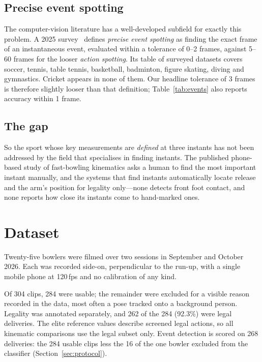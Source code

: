 \documentclass[11pt,a4paper]{article}
\begin{document}
\subsection{Precise event spotting}

The computer-vision literature has a well-developed subfield for
exactly this problem. A 2025 survey~\cite{pes2025} defines \emph{precise event
spotting} as finding the exact frame of an instantaneous event, evaluated
within a tolerance of 0--2 frames, against 5--60 frames for the looser
\emph{action spotting}. Its table of surveyed datasets covers soccer, tennis,
table tennis, basketball, badminton, figure skating, diving and gymnastics.
Cricket appears in none of them. Our headline tolerance of 3 frames is
therefore slightly looser than that definition; Table~\ref{tab:events} also
reports accuracy within 1 frame.

\subsection{The gap}

So the sport whose key measurements are \emph{defined} at three instants has
not been addressed by the field that specialises in finding instants. The
published phone-based study of fast-bowling kinematics asks a human to find
the most important instant manually, and the systems that find instants
automatically locate release and the arm's position for legality only---none
detects front foot contact, and none reports how close its instants come to
hand-marked ones.

\section{Dataset}
\label{sec:dataset}

Twenty-five bowlers were filmed over two sessions in September and October
2026. Each was recorded side-on, perpendicular to the run-up, with a single
mobile phone at 120\,fps and no calibration of any kind.



Of 304 clips, 284 were usable; the remainder were excluded for a visible
reason recorded in the data, most often a pose tracked onto a background
person. Legality was annotated separately, and 262 of the 284 (92.3\%) were
legal deliveries. The elite reference values describe screened legal actions,
so all kinematic comparisons use the legal subset only. Event detection is
scored on 268 deliveries: the 284 usable clips less the 16 of the one bowler
excluded from the classifier (Section~\ref{sec:protocol}).
\end{document}
